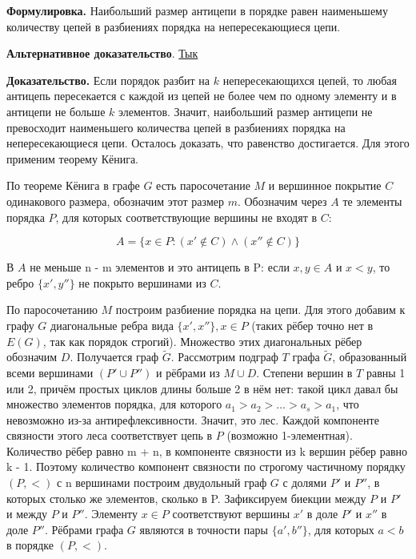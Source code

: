 \documentclass[a4paper, 10pt]{article}
\begin{document}
\textbf{Формулировка.} Наибольший размер антицепи в порядке равен наименьшему количеству цепей в разбиениях порядка на непересекающиеся цепи.

\medskip

\textbf{Альтернативное доказательство}. \href{https://youtu.be/hU1f8-HAqSI?t=2679}{Тык} \footnotemark[1]{}


\medskip

\textbf{Доказательство.} Если порядок разбит на $k$ непересекающихся цепей, то любая антицепь пересекается с каждой из цепей не более чем по одному элементу и в антицепи не больше $k$ элементов. Значит, наибольший размер антицепи не превосходит наименьшего количества цепей в разбиениях порядка на непересекающиеся цепи. Осталось доказать, что равенство достигается. Для этого применим теорему Кёнига.

\medskip

\begin{center}
    \drWalley[15][yellow]
\end{center}




По теореме Кёнига в графе $G$ есть паросочетание $M$ и вершинное покрытие $C$ одинакового размера, обозначим этот размер $m$. Обозначим через $A$ те элементы порядка $P$, для которых соответствующие вершины не входят в $C$:

$$A = \{x \in P \colon (x'\notin C) \wedge (x'' \notin C)\}$$

В $A$ не меньше n - m элементов и это антицепь в P: если $x, y \in A$ и $x < y$, то ребро $\{x', y''\}$ не покрыто вершинами из $C$.

По паросочетанию $M$ построим разбиение порядка на цепи. Для этого добавим к графу $G$ диагональные ребра вида $\{x', x''\}, x \in P$ (таких рёбер точно нет в $E(G)$, так как порядок строгий). Множество этих диагональных рёбер обозначим $D$. Получается граф $\tilde{G}$. Рассмотрим подграф $T$ графа $\tilde{G}$, образованный всеми вершинами $(P' \cup P'')$ и рёбрами из $M \cup D$. Степени вершин в $T$ равны 1 или 2, причём простых циклов длины больше 2 в нём нет: такой цикл давал бы множество элементов порядка, для которого $a_1 > a_2 > \dots > a_s > a_1$, что невозможно из-за антирефлексивности. Значит, это лес. Каждой компоненте связности этого леса соответствует цепь в $P$ (возможно 1-элементная). Количество рёбер равно m + n, в компоненте связности из k вершин рёбер равно k - 1. Поэтому количество компонент связности по строгому частичному порядку $(P, <)$ с n вершинами построим двудольный граф $G$ с долями $P'$ и $P''$, в которых столько же элементов, сколько в P. Зафиксируем биекции между $P$ и $P'$ и между $P$ и $P''$. Элементу $x \in P$ соответствуют вершины $x'$ в доле $P'$ и $x''$ в доле $P''$. Рёбрами графа $G$ являются в точности пары $\{a', b''\}$, для которых $a < b$ в порядке $(P, <)$.
\end{document}
